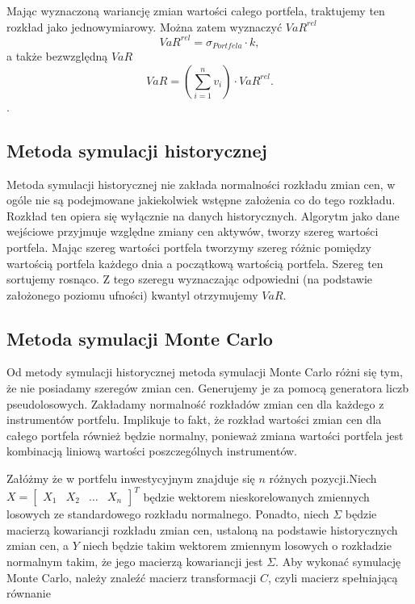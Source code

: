 \documentclass[12pt,titlepage]{article}
\numberwithin{equation}{section}
\begin{document}
Mając wyznaczoną wariancję zmian wartości całego portfela, traktujemy ten rozkład jako jednowymiarowy. Można zatem wyznaczyć $VaR^{rel}$
$$VaR^{rel}=\sigma_{Portfela} \cdot k,$$
a także bezwzględną $VaR$
$$VaR = (\sum_{i=1}^{n}v_i) \cdot VaR^{rel}.$$.



\subsection{Metoda symulacji historycznej}



Metoda symulacji historycznej nie zakłada normalności rozkładu zmian cen, w ogóle nie są podejmowane jakiekolwiek wstępne założenia co do tego rozkładu. Rozkład ten opiera się wyłącznie na danych historycznych. Algorytm jako dane wejściowe przyjmuje względne zmiany cen aktywów, tworzy szereg wartości portfela. Mając szereg wartości portfela tworzymy szereg różnic pomiędzy wartością portfela każdego dnia a początkową wartością portfela. Szereg ten sortujemy rosnąco. Z tego szeregu wyznaczając odpowiedni (na podstawie założonego poziomu ufności) kwantyl otrzymujemy $VaR$.\\



\subsection{Metoda symulacji Monte Carlo}


Od metody symulacji historycznej  metoda symulacji Monte Carlo różni się tym, że nie posiadamy szeregów zmian cen. Generujemy je za pomocą generatora liczb pseudolosowych. Zakładamy normalność rozkładów zmian cen dla każdego z instrumentów portfelu. Implikuje to fakt, że rozkład wartości zmian cen dla całego portfela również będzie normalny, ponieważ zmiana wartości portfela jest kombinacją liniową wartości poszczególnych instrumentów. 

Załóżmy że w portfelu inwestycyjnym znajduje się $n$ różnych pozycji.Niech $X=\begin{bmatrix}
 X_1 & X_2 & \hdots & X_n
\end{bmatrix}^T $ będzie wektorem nieskorelowanych zmiennych losowych ze standardowego rozkładu normalnego. Ponadto, niech $\Sigma$ będzie macierzą kowariancji rozkładu zmian cen, ustaloną na podstawie historycznych zmian cen, a $Y$ niech będzie takim wektorem zmiennym losowych o rozkładzie normalnym takim, że jego macierzą kowariancji jest $\Sigma$. Aby wykonać symulację Monte Carlo, należy znaleźć macierz transformacji $C$, czyli macierz spełniającą równanie 
\end{document}
